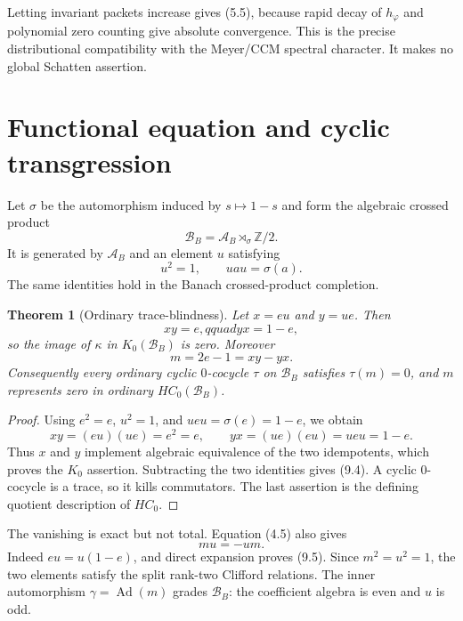 \documentclass[11pt]{article}
\newtheorem{theorem}{Theorem}[section]
\theoremstyle{definition}
\theoremstyle{remark}
\newcommand{\Z}{\mathbb Z}
\newcommand{\A}{\mathcal A}
\newcommand{\B}{\mathcal B}
\begin{document}
Letting invariant packets increase gives (5.5), because rapid decay of
$h_\varphi$ and polynomial zero counting give absolute convergence.  This is
the precise distributional compatibility with the Meyer/CCM spectral
character.  It makes no global Schatten assertion.

\section{Functional equation and cyclic transgression}

Let $\sigma$ be the automorphism induced by $s\mapsto1-s$ and form the algebraic
crossed product
\[
             \B_B=\A_B\rtimes_\sigma\Z/2.            \tag{9.1}
\]
It is generated by $\A_B$ and an element $u$ satisfying
\[
             u^2=1,\qquad uau=\sigma(a).              \tag{9.2}
\]
The same identities hold in the Banach crossed-product completion.

\begin{theorem}[Ordinary trace-blindness]\label{thm:traceblind}
Let $x=eu$ and $y=ue$.  Then
\[
        xy=e,qquad yx=1-e,                            \tag{9.3}
\]
so the image of $\kappa$ in $K_0(\B_B)$ is zero.  Moreover
\[
        m=2e-1=xy-yx.                                  \tag{9.4}
\]
Consequently every ordinary cyclic $0$-cocycle $\tau$ on $\B_B$ satisfies
$\tau(m)=0$, and $m$ represents zero in ordinary $HC_0(\B_B)$.
\end{theorem}

\begin{proof}
Using $e^2=e$, $u^2=1$, and $ueu=\sigma(e)=1-e$, we obtain
\[
 xy=(eu)(ue)=e^2=e,
 \qquad
 yx=(ue)(eu)=ueu=1-e.
\]
Thus $x$ and $y$ implement algebraic equivalence of the two idempotents, which
proves the $K_0$ assertion.  Subtracting the two identities gives (9.4).  A
cyclic $0$-cocycle is a trace, so it kills commutators.  The last assertion is
the defining quotient description of $HC_0$.
\end{proof}

The vanishing is exact but not total.  Equation (4.5) also gives
\[
                       mu=-um.                        \tag{9.5}
\]
Indeed $eu=u(1-e)$, and direct expansion proves (9.5).  Since $m^2=u^2=1$,
the two elements satisfy the split rank-two Clifford relations.  The inner
automorphism $\gamma=\operatorname{Ad}(m)$ grades $\B_B$: the coefficient
algebra is even and $u$ is odd.
\end{document}
